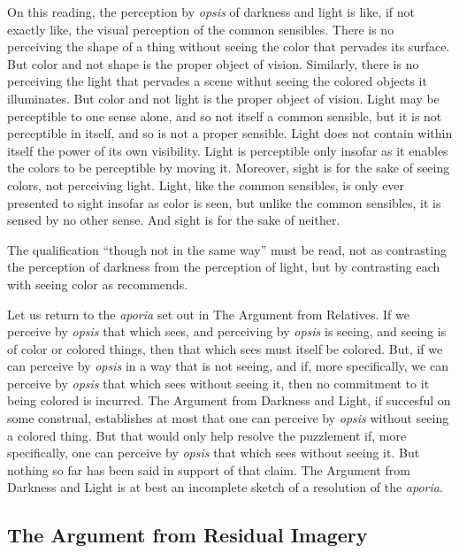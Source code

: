 On this reading, the perception by \emph{opsis} of darkness and light is like, if not exactly like, the visual perception of the common sensibles. There is no perceiving the shape of a thing without seeing the color that pervades its surface. But color and not shape is the proper object of vision. Similarly, there is no perceiving the light that pervades a scene withut seeing the colored objects it illuminates. But color and not light is the proper object of vision. Light may be perceptible to one sense alone, and so not itself a common sensible, but it is not perceptible in itself, and so is not a proper sensible. Light does not contain within itself the power of its own visibility. Light is perceptible only insofar as it enables the colors to be perceptible by moving it. Moreover, sight is for the sake of seeing colors, not perceiving light. Light, like the common sensibles, is only ever presented to sight insofar as color is seen, but unlike the common sensibles, it is sensed by no other sense. And sight is for the sake of neither.

The qualification ``though not in the same way'' must be read, not as contrasting the perception of darkness from the perception of light, but by contrasting each with seeing color as \citet[275]{Ross:1961uq} recommends.

Let us return to the \emph{aporia} set out in The Argument from Relatives. If we perceive by \emph{opsis} that which sees, and perceiving by \emph{opsis} is seeing, and seeing is of color or colored things, then that which sees must itself be colored. But, if we can perceive by \emph{opsis} in a way that is not seeing, and if, more specifically, we can perceive by \emph{opsis} that which sees without seeing it, then no commitment to it being colored is incurred. The Argument from Darkness and Light, if succesful on some construal, establishes at most that one can perceive by \emph{opsis} without seeing a colored thing. But that would only help resolve the puzzlement if, more specifically, one can perceive by \emph{opsis} that which sees without seeing it. But nothing so far has been said in support of that claim. The Argument from Darkness and Light is at best an incomplete sketch of a resolution of the \emph{aporia}.


\subsection{The Argument from Residual Imagery} %
\label{sub:the_argument_from_residual_imagery}

